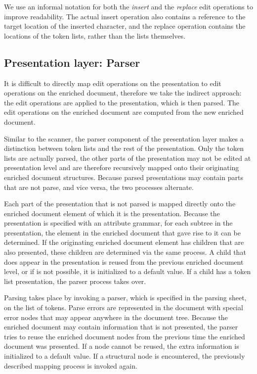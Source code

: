 We use an informal notation for both the {\em insert} and the {\em replace} edit operations to improve readability. The actual insert operation also contains a reference to the target location of the inserted character, and the replace operation contains the locations of the token lists, rather than the lists themselves. 

\subsection{Presentation layer: Parser} \label{sect:parser}
        
It is difficult to directly map edit operations on the presentation to edit operations on the enriched document, therefore we take the indirect approach: the edit operations are applied to the presentation, which is then parsed. The edit operations on the enriched document are computed from the new enriched document.

Similar to the scanner, the parser component of the presentation layer makes a distinction between token lists and the rest of the presentation. Only the token lists are actually parsed, the other parts of the presentation may not be edited at presentation level and are therefore recursively mapped onto their originating enriched document structures. Because parsed presentations may contain parts that are not parse, and vice versa, the two processes alternate. 

Each part of the presentation that is not parsed is mapped directly onto the enriched document element of which it is the presentation. Because the presentation is specified with an attribute grammar, for each subtree in the presentation, the element in the enriched document that gave rise to it can be determined. If the originating enriched document element has children that are also presented, these children are determined via the same process. A child that does appear in the presentation is reused from the previous enriched document level, or if is not possible, it is initialized to a default value. If a child has a token list presentation, the parser process takes over.

Parsing takes place by invoking a parser, which is specified in the parsing sheet, on the list of tokens. Parse errors are represented in the document with special error nodes that may appear anywhere in the document tree.  Because the enriched document may contain information that is not presented, the parser tries to reuse the enriched document nodes from the previous time the enriched document was presented. If a node cannot be reused, the extra information is initialized to a default value. If a structural node is encountered, the previously described mapping process is invoked again.

